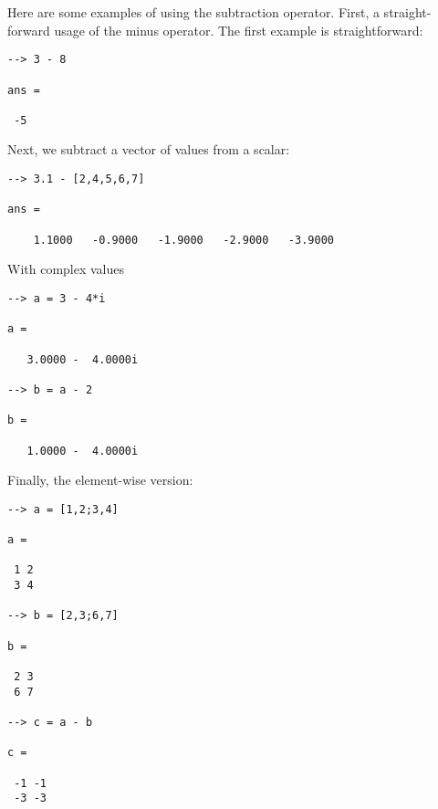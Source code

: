 Here are some examples of using the subtraction operator.  First, a 
straight-forward usage of the minus operator.  The first example
is straightforward:
\begin{verbatim}
--> 3 - 8

ans = 

 -5 
\end{verbatim}
Next, we subtract a vector of values from a scalar:
\begin{verbatim}
--> 3.1 - [2,4,5,6,7]

ans = 

    1.1000   -0.9000   -1.9000   -2.9000   -3.9000 
\end{verbatim}
With complex values
\begin{verbatim}
--> a = 3 - 4*i

a = 

   3.0000 -  4.0000i 

--> b = a - 2

b = 

   1.0000 -  4.0000i 
\end{verbatim}
Finally, the element-wise version:
\begin{verbatim}
--> a = [1,2;3,4]

a = 

 1 2 
 3 4 

--> b = [2,3;6,7]

b = 

 2 3 
 6 7 

--> c = a - b

c = 

 -1 -1 
 -3 -3 
\end{verbatim}

